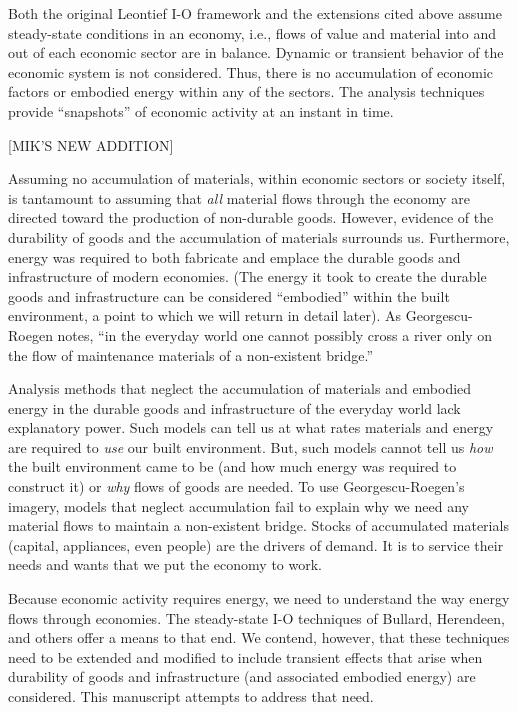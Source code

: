 Both the original Leontief I-O framework 
and the extensions cited above 
assume steady-state conditions in an economy, 
i.e., flows of value and material into 
and out of each economic sector are in balance. 
Dynamic or transient behavior 
of the economic system is not considered. 
Thus, there is no accumulation of economic factors 
or embodied energy within any of the sectors. 
The analysis techniques provide ``snapshots'' 
of economic activity at an instant in time.

[MIK'S NEW ADDITION]

Assuming no accumulation of materials, 
within economic sectors or society itself, 
is tantamount to assuming that \emph{all} material flows 
through the economy are directed toward the production of non-durable goods. 
However, evidence of the durability of goods 
and the accumulation of materials surrounds us. 
Furthermore, energy was required to both fabricate and emplace 
the durable goods and infrastructure of modern economies. 
(The energy it took to create the durable goods and infrastructure 
can be considered ``embodied'' within the built environment, 
a point to which we will return in detail later). 
As Georgescu-Roegen notes, 
``in the everyday world one cannot possibly cross a river 
only on the flow of maintenance materials of a non-existent bridge.''\cite{G-R1975}

Analysis methods that neglect the accumulation 
of materials and embodied energy 
in the durable goods and infrastructure 
of the everyday world lack explanatory power. 
Such models can tell us at what rates materials and energy are required 
to \emph{use} our built environment. 
But, such models cannot tell us \emph{how} 
the built environment came to be 
(and how much energy was required to construct it) 
or \emph{why} flows of goods are needed. 
To use Georgescu-Roegen's imagery, 
models that neglect accumulation fail to explain 
why we need any material flows to maintain a non-existent bridge. 
Stocks of accumulated materials 
(capital, appliances, even people) 
are the drivers of demand. 
It is to service their needs and wants that we put the economy to work. 

Because economic activity requires energy, 
we need to understand the way energy flows through economies. 
The steady-state I-O techniques of Bullard, Herendeen, 
and others\cite{Bullard1975,Herendeen1978} 
offer a means to that end. 
We contend, however, that these techniques 
need to be extended and modified to include transient effects 
that arise when durability of goods and infrastructure 
(and associated embodied energy) are considered. 
This manuscript attempts to address that need.




